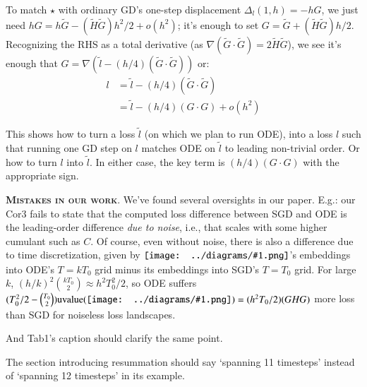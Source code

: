 \documentclass[12pt]{article}
\newcommand{\cor}[1]{\textmd{{\color{gray}Cor}{#1}}}
\newcommand{\tab}[1]{\textmd{{\color{gray}Tab}{#1}}}
\newcommand{\cit}[1]{[\textbf{#1}]}
\newcommand{\moosect}[1]{\par\noindent\hspace{-1cm}\textsc{\textbf{#1}}.}
\newcommand{\sizeddia}[2]{%
    \begin{gathered}%
        \texttt{[image: ../diagrams/\#1.png]}%
    \end{gathered}%
}
\newcommand{\mdia}[1]{\protect \sizeddia{#1}{0.14}}
\begin{document}
    To match $\star$ with ordinary GD's one-step displacement $\Delta_l(1,h)
    = -hG$, we just need $hG = h\tilde{G} - (\tilde H \tilde G) h^2/2 + o(h^2)$;
    it's enough to set $G=\tilde{G}+(\tilde H \tilde G) h/2$.  Recognizing
    the RHS as a total derivative (as $\nabla(\tilde G\cdot \tilde
    G) = 2\tilde{H}\tilde{G}$), we see it's enough that $G = \nabla(\tilde l - (h/4) (\tilde G\cdot \tilde G))$ or:
    \begin{align*}
        l &= \tilde l - (h/4) (\tilde G\cdot \tilde G) \\
          &= \tilde l - (h/4) (G\cdot G) + o(h^2)
    \end{align*}

    This shows how to turn a loss $\tilde l$ (on which we plan to run ODE),
    into a loss $l$ such that running one GD step on $l$ matches ODE on $\tilde
    l$ to leading non-trivial order.  Or how to turn
    $l$ into $\tilde l$.  In either case, the key term is $(h/4) (G\cdot G)$ with
    the appropriate sign.

\moosect{Mistakes in our work}
    We've found several oversights in our paper.
    E.g.: our \cor{3} fails to state that the computed loss difference
    between SGD and ODE is the leading-order difference \emph{due to noise},
    i.e., that scales with some higher cumulant such as $C$.  Of course, even
    without noise, there is also a difference due to time discretization, given
    by $\mdia{c(0-1-2)(01-12)}$'s embeddings into ODE's $T=kT_0$ grid minus
    its embeddings into SGD's $T=T_0$ grid.  For large $k$, $(h/k)^2
    {kT_0\choose 2}\approx h^2T_0^2/2$, so ODE suffers $(T_0^2/2 - {T_0\choose
    2}) \text{uvalue}(\mdia{c(0-1-2)(01-12)}) = (h^2 T_0/2)(GHG)$ more loss
    than SGD for noiseless loss landscapes.

    And \tab{1}'s caption should clarify the same point. 

    The section introducing resummation should say `spanning 11 timesteps'
    instead of `spanning 12 timesteps' in its example.

\end{document}
